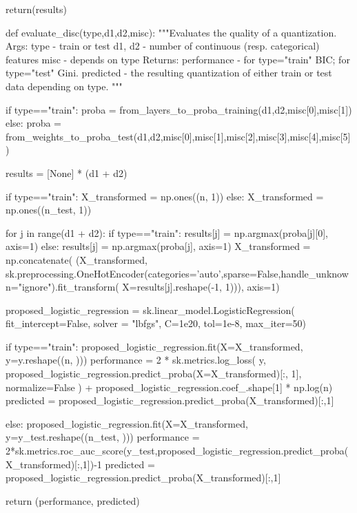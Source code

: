 \begin{pylisting}
        return(results)
    
    
    def evaluate_disc(type,d1,d2,misc):
        """Evaluates the quality of a quantization.
	    Args:
	       type - train or test
	       d1, d2 - number of continuous (resp. categorical) features
	       misc - depends on type
	    Returns:
			performance - for type="train" BIC; for type="test" Gini.
			predicted - the resulting quantization of either train or test data depending on type.
	    """

        if type=="train":
            proba = from_layers_to_proba_training(d1,d2,misc[0],misc[1])
        else:
            proba = from_weights_to_proba_test(d1,d2,misc[0],misc[1],misc[2],misc[3],misc[4],misc[5])


        results = [None] * (d1 + d2)

        if type=="train":
            X_transformed = np.ones((n, 1))
        else:
            X_transformed = np.ones((n_test, 1))

        for j in range(d1 + d2):
            if type=="train":
                results[j] = np.argmax(proba[j][0], axis=1)
            else:
                results[j] = np.argmax(proba[j], axis=1)
            X_transformed = np.concatenate(
                (X_transformed, sk.preprocessing.OneHotEncoder(categories='auto',sparse=False,handle_unknown="ignore").fit_transform(
                    X=results[j].reshape(-1, 1))),
                axis=1)

        proposed_logistic_regression = sk.linear_model.LogisticRegression(
            fit_intercept=False, solver = "lbfgs", C=1e20, tol=1e-8, max_iter=50)


        if type=="train":
            proposed_logistic_regression.fit(X=X_transformed, y=y.reshape((n, )))
            performance = 2 * sk.metrics.log_loss(
              y,
              proposed_logistic_regression.predict_proba(X=X_transformed)[:, 1],
              normalize=False
          ) + proposed_logistic_regression.coef_.shape[1] * np.log(n)
            predicted = proposed_logistic_regression.predict_proba(X_transformed)[:,1]

        else:
            proposed_logistic_regression.fit(X=X_transformed, y=y_test.reshape((n_test, )))
            performance = 2*sk.metrics.roc_auc_score(y_test,proposed_logistic_regression.predict_proba(X_transformed)[:,1])-1
            predicted = proposed_logistic_regression.predict_proba(X_transformed)[:,1]

        return (performance, predicted)



\end{pylisting}
